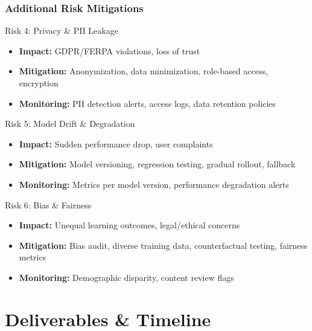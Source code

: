 \documentclass[aspectratio=169]{beamer}
\begin{document}
\begin{frame}
\frametitle{Additional Risk Mitigations}
\begin{block}{Risk 4: Privacy \& PII Leakage}
\begin{itemize}
\item \textbf{Impact:} GDPR/FERPA violations, loss of trust
\item \textbf{Mitigation:} Anonymization, data minimization, role-based access, encryption
\item \textbf{Monitoring:} PII detection alerts, access logs, data retention policies
\end{itemize}
\end{block}

\begin{block}{Risk 5: Model Drift \& Degradation}
\begin{itemize}
\item \textbf{Impact:} Sudden performance drop, user complaints
\item \textbf{Mitigation:} Model versioning, regression testing, gradual rollout, fallback
\item \textbf{Monitoring:} Metrics per model version, performance degradation alerts
\end{itemize}
\end{block}

\begin{block}{Risk 6: Bias \& Fairness}
\begin{itemize}
\item \textbf{Impact:} Unequal learning outcomes, legal/ethical concerns
\item \textbf{Mitigation:} Bias audit, diverse training data, counterfactual testing, fairness metrics
\item \textbf{Monitoring:} Demographic disparity, content review flags
\end{itemize}
\end{block}
\end{frame}

\section{Deliverables \& Timeline}
\end{document}
